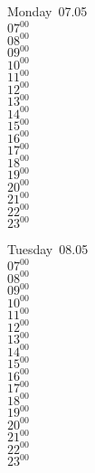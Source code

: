 \documentclass[11pt, a4paper]{book}\usepackage[]{graphicx}\usepackage[]{color}
\begin{document}
\begin{headerbox}
\end{headerbox}
\begin{weekdaybox}
  Monday~07.05\\
  { 
  \vfill
  $07^{00}$\\
$08^{00}$\\
$09^{00}$\\
$10^{00}$\\
$11^{00}$\\
$12^{00}$\\
$13^{00}$\\
$14^{00}$\\
$15^{00}$\\
$16^{00}$\\
$17^{00}$\\
$18^{00}$\\
$19^{00}$\\
$20^{00}$\\
$21^{00}$\\
$22^{00}$\\
$23^{00}$\\
  }
\end{weekdaybox}
\begin{weekdaybox}
  Tuesday~08.05\\
  { 
  \vfill
  $07^{00}$\\
$08^{00}$\\
$09^{00}$\\
$10^{00}$\\
$11^{00}$\\
$12^{00}$\\
$13^{00}$\\
$14^{00}$\\
$15^{00}$\\
$16^{00}$\\
$17^{00}$\\
$18^{00}$\\
$19^{00}$\\
$20^{00}$\\
$21^{00}$\\
$22^{00}$\\
$23^{00}$\\
  }
\end{weekdaybox}
\end{document}
